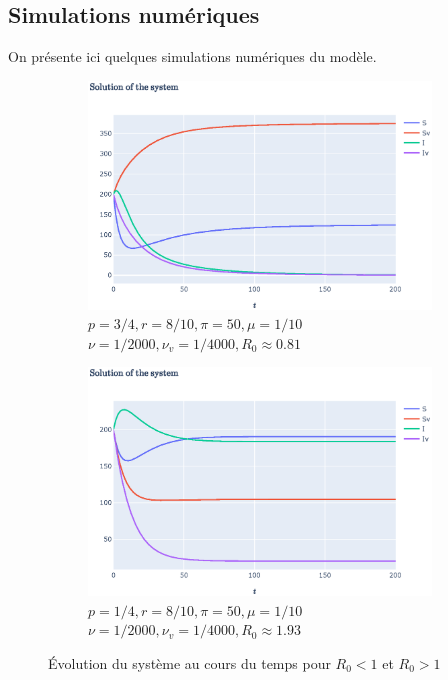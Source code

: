 \documentclass[11pt]{article}
\begin{document}
\subsection{Simulations num\'eriques}
On pr\'esente ici quelques simulations num\'eriques du mod\`ele.
\begin{figure}[hb]
	\begin{subfigure}{0.49\textwidth}
	  \centering
	  \includegraphics[width=\linewidth]{../figures/ex2_r0_lt_1.eps}  
	  \caption{$p = 3/4,
		r = 8/10, 
		\pi = 50,
		\mu = 1/10$\\
		$\nu = 1/2000,
		\nu_v = 1/4000, R_0 \approx 0.81$}
	  \label{fig:ex2 evolution r0 lt 1}
	\end{subfigure}
	\begin{subfigure}{0.49\textwidth}
	  \centering
	  \includegraphics[width=\linewidth]{../figures/ex2_r0_gt_1.eps}  
	  \caption{$p = 1/4,
		r = 8/10, 
		\pi = 50,
		\mu = 1/10$\\
		$\nu = 1/2000,
		\nu_v = 1/4000, R_0 \approx 1.93$}
	  \label{fig:ex2 evolution r0 gt 1}
	\end{subfigure}
	\centering
	\caption{\'Evolution du syst\`eme au cours du temps pour $R_0 < 1$ et $R_0 > 1$
	}
	\label{fig:ex2 evolution}
\end{figure}
\end{document}
